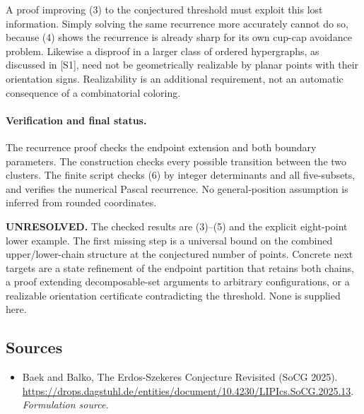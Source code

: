 \documentclass[11pt]{article}
\begin{document}
A proof improving (3) to the conjectured threshold must exploit this
lost information. Simply solving the same recurrence more accurately
cannot do so, because (4) shows the recurrence is already sharp for
its own cup-cap avoidance problem. Likewise a disproof in a larger
class of ordered hypergraphs, as discussed in [S1], need not be
geometrically realizable by planar points with their orientation signs.
Realizability is an additional requirement, not an automatic consequence
of a combinatorial coloring.

\paragraph{Verification and final status.}
The recurrence proof checks the endpoint extension and both boundary
parameters. The construction checks every possible transition between
the two clusters. The finite script checks (6) by integer determinants
and all five-subsets, and verifies the numerical Pascal recurrence.
No general-position assumption is inferred from rounded coordinates.

\textbf{UNRESOLVED.} The checked results are (3)--(5) and the explicit
eight-point lower example. The first missing step is a universal bound
on the combined upper/lower-chain structure at the conjectured number
of points. Concrete next targets are a state refinement of the endpoint
partition that retains both chains, a proof extending decomposable-set
arguments to arbitrary configurations, or a realizable orientation
certificate contradicting the threshold. None is supplied here.

\subsection{Sources}
\begin{itemize}
\item[S1]Baek and Balko, The Erdos-Szekeres Conjecture Revisited (SoCG 2025).
\url{https://drops.dagstuhl.de/entities/document/10.4230/LIPIcs.SoCG.2025.13}.
\textit{Formulation source.}
\end{itemize}
\end{document}
